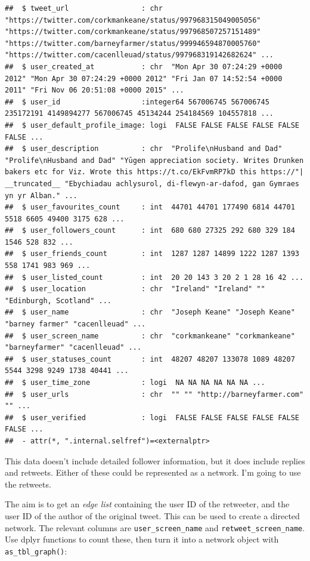 \documentclass[
]{book}
\begin{document}
\begin{verbatim}
##  $ tweet_url                 : chr  "https://twitter.com/corkmankeane/status/997968315049005056" "https://twitter.com/corkmankeane/status/997968507257151489" "https://twitter.com/barneyfarmer/status/999946594870005760" "https://twitter.com/cacenlleuad/status/997968319142682624" ...
##  $ user_created_at           : chr  "Mon Apr 30 07:24:29 +0000 2012" "Mon Apr 30 07:24:29 +0000 2012" "Fri Jan 07 14:52:54 +0000 2011" "Fri Nov 06 20:51:08 +0000 2015" ...
##  $ user_id                   :integer64 567006745 567006745 235172191 4149894277 567006745 45134244 254184569 104557818 ... 
##  $ user_default_profile_image: logi  FALSE FALSE FALSE FALSE FALSE FALSE ...
##  $ user_description          : chr  "Prolife\nHusband and Dad" "Prolife\nHusband and Dad" "Yūgen appreciation society. Writes Drunken bakers etc for Viz. Wrote this https://t.co/EkFvmRP7kD this https://"| __truncated__ "Ebychiadau achlysurol, di-flewyn-ar-dafod, gan Gymraes yn yr Alban." ...
##  $ user_favourites_count     : int  44701 44701 177490 6814 44701 5518 6605 49400 3175 628 ...
##  $ user_followers_count      : int  680 680 27325 292 680 329 184 1546 528 832 ...
##  $ user_friends_count        : int  1287 1287 14899 1222 1287 1393 558 1741 983 969 ...
##  $ user_listed_count         : int  20 20 143 3 20 2 1 28 16 42 ...
##  $ user_location             : chr  "Ireland" "Ireland" "" "Edinburgh, Scotland" ...
##  $ user_name                 : chr  "Joseph Keane" "Joseph Keane" "barney farmer" "cacenlleuad" ...
##  $ user_screen_name          : chr  "corkmankeane" "corkmankeane" "barneyfarmer" "cacenlleuad" ...
##  $ user_statuses_count       : int  48207 48207 133078 1089 48207 5544 3298 9249 1738 40441 ...
##  $ user_time_zone            : logi  NA NA NA NA NA NA ...
##  $ user_urls                 : chr  "" "" "http://barneyfarmer.com" "" ...
##  $ user_verified             : logi  FALSE FALSE FALSE FALSE FALSE FALSE ...
##  - attr(*, ".internal.selfref")=<externalptr>
\end{verbatim}

This data doesn't include detailed follower information, but it does include replies and retweets. Either of these could be represented as a network. I'm going to use the retweets.

The aim is to get an \emph{edge list} containing the user ID of the retweeter, and the user ID of the author of the original tweet. This can be used to create a directed network. The relevant columns are \texttt{user\_screen\_name} and \texttt{retweet\_screen\_name}. Use dplyr functions to count these, then turn it into a network object with \texttt{as\_tbl\_graph()}:
\end{document}
